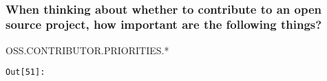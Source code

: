\documentclass[11pt]{article}
\begin{document}
    


    \begin{center}
    \end{center}
    { \hspace*{\fill} \\}
    
    \subsubsection{When thinking about whether to contribute to an open
source project, how important are the following
things?}\label{when-thinking-about-whether-to-contribute-to-an-open-source-project-how-important-are-the-following-things}

OSS.CONTRIBUTOR.PRIORITIES.*


\texttt{\color{outcolor}Out[{\color{outcolor}51}]:}
    
\end{document}
